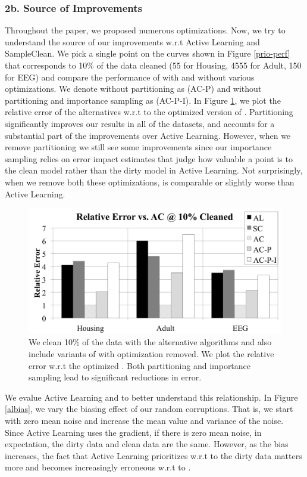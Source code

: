 \subsubsection{2b. Source of Improvements}
Throughout the paper, we proposed numerous optimizations.
Now, we try to understand the source of our improvements w.r.t Active Learning and SampleClean.
We pick a single point on the curves shown in Figure \ref{prio-perf} that corresponds to 10\% of the data cleaned (55 for Housing, 4555 for Adult, 150 for EEG) and compare the performance of \sys with and without various optimizations.
We denote \sys without partitioning as (AC-P) and \sys without partitioning and importance sampling as (AC-P-I).
In Figure \ref{opts}, we plot the relative error of the alternatives w.r.t to the optimized version of \sys.
Partitioning significantly improves our results in all of the datasets, and accounts for a substantial part of the improvements over Active Learning.
However, when we remove partitioning we still see some improvements since our importance sampling relies on error impact estimates that judge how valuable a point is to the clean model rather than the dirty model in Active Learning.
Not surprisingly, when we remove both these optimizations, \sys is comparable or slightly worse than Active Learning.

\begin{figure}[ht!]
\centering
 \includegraphics[width=\columnwidth]{exp/exp8.png}
 \caption{We clean 10\% of the data with the alternative algorithms and also include variants of \sys with optimization removed. We plot the relative error w.r.t the optimized \sys. Both partitioning and importance sampling lead to significant reductions in error. \label{opts}}
\end{figure}

\iffalse
We evalue Active Learning and \sys to better understand this relationship.
In Figure \ref{albias}, we vary the biasing effect of our random corruptions.
That is, we start with zero mean noise and increase the mean value and variance of the noise.
Since Active Learning uses the gradient, if there is zero mean noise, in expectation, the dirty data and clean data are the same.
However, as the bias increases, the fact that Active Learning prioritizes w.r.t to the dirty data matters more and becomes increasingly erroneous w.r.t to \sys.

